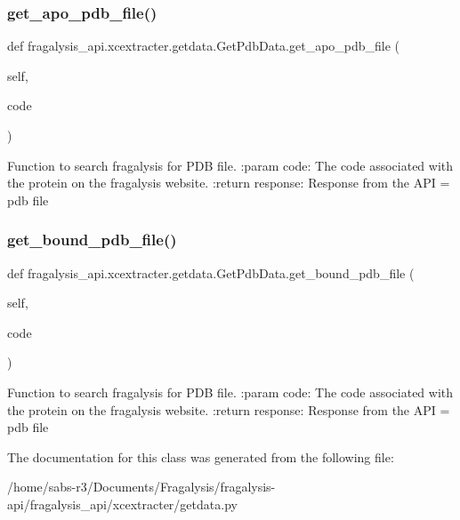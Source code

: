 \subsubsection{\texorpdfstring{get\+\_\+apo\+\_\+pdb\+\_\+file()}{get\_apo\_pdb\_file()}}
{\footnotesize\ttfamily def fragalysis\+\_\+api.\+xcextracter.\+getdata.\+Get\+Pdb\+Data.\+get\+\_\+apo\+\_\+pdb\+\_\+file (\begin{DoxyParamCaption}\item[{}]{self,  }\item[{}]{code }\end{DoxyParamCaption})}

\begin{DoxyVerb}Function to search fragalysis for PDB file.
:param code: The code associated with the protein on the fragalysis website.
:return response: Response from the API = pdb file
\end{DoxyVerb}
 \mbox{\label{classfragalysis__api_1_1xcextracter_1_1getdata_1_1_get_pdb_data_afcb12b3a8f39a7d54917eefed0a1b4af}} 
\subsubsection{\texorpdfstring{get\+\_\+bound\+\_\+pdb\+\_\+file()}{get\_bound\_pdb\_file()}}
{\footnotesize\ttfamily def fragalysis\+\_\+api.\+xcextracter.\+getdata.\+Get\+Pdb\+Data.\+get\+\_\+bound\+\_\+pdb\+\_\+file (\begin{DoxyParamCaption}\item[{}]{self,  }\item[{}]{code }\end{DoxyParamCaption})}

\begin{DoxyVerb}Function to search fragalysis for PDB file.
:param code: The code associated with the protein on the fragalysis website.
:return response: Response from the API = pdb file
\end{DoxyVerb}
 

The documentation for this class was generated from the following file\+:\begin{DoxyCompactItemize}
\item 
/home/sabs-\/r3/\+Documents/\+Fragalysis/fragalysis-\/api/fragalysis\+\_\+api/xcextracter/getdata.\+py\end{DoxyCompactItemize}
